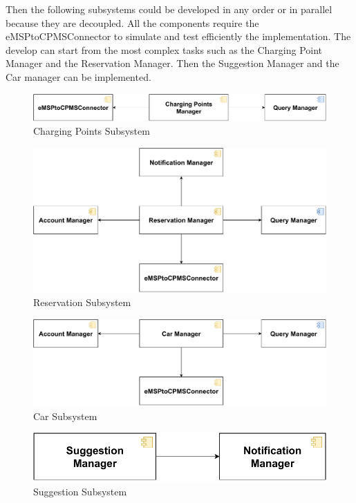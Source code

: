 Then the following subsystems could be developed in any order or in parallel because they are decoupled. All the components require
the eMSPtoCPMSConnector to simulate and test efficiently the implementation. 
The develop can start from the most complex tasks such as the Charging Point Manager and the Reservation Manager. 
Then the Suggestion Manager and the Car manager can be implemented.
\begin{figure}[H]
    \centering
    \includegraphics[scale=0.6]{src/Integration/eMSPCP.pdf}
    \caption{Charging Points Subsystem}
\end{figure}
\begin{figure}[H]
    \centering
    \includegraphics[scale=0.6]{src/Integration/eMSPReservation.pdf}
    \caption{Reservation Subsystem}
\end{figure}
\begin{figure}[H]
    \centering
    \includegraphics[scale=0.6]{src/Integration/eMSPCar.pdf}
    \caption{Car Subsystem}
\end{figure}
\begin{figure}[H]
    \centering
    \includegraphics[scale=0.6]{src/Integration/eMSPSuggestion.pdf}
    \caption{Suggestion Subsystem}
\end{figure}
